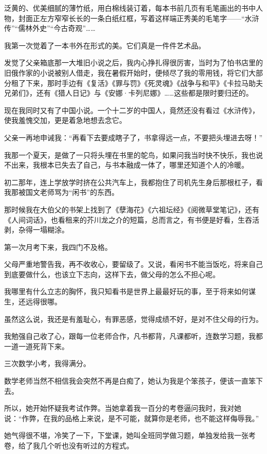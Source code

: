 \par 泛黄的、优美细腻的薄竹纸，用白棉线装订着，每本书前几页有毛笔画出的书中人物，封面正左方窄窄长长的一条白纸红框，写着这样端正秀美的毛笔字——“水浒传”“儒林外史”“今古奇观”……
\par 我第一次觉着了一本书外在形式的美。它们真是一件件艺术品。
\par 发觉了父亲箱底那一大堆旧小说之后，我内心挣扎得很厉害，当时为了怕书店里的旧俄作家的小说被别人借走，我在暑假开始时，便倾尽了我的零用钱，将它们大部分租了下来，那时手边有《复活》《罪与罚》《死灵魂》《战争与和平》《卡拉马助夫兄弟们》，还有《猎人日记》与《安娜·卡列尼娜》……这些都是限时要归还的。
\par 现在我同时又有了中国小说。一个十二岁的中国人，竟然还没有看过《水浒传》，使我羞愧交加，更是着急地想去念它。
\par 父亲一再地申诫我：“再看下去要成瞎子了，书拿得远一点，不要把头埋进去呀！”
\par 我那一个夏天，是做了一只将头埋在书里的鸵鸟，如果问我当时快不快乐，我也说不出来，我根本已失去了自己，与书本融成一体了，哪里还知道个人的冷暖。
\par 初二那年，连上学放学时挤在公共汽车上，我都抱住了司机先生身后那根杠子，看我那被国文老师骂为“闲书”的东西。
\par 那时候我在大伯父的书架上找到了《孽海花》《六祖坛经》《阅微草堂笔记》，还有《人间词话》，也看租来的芥川龙之介的短篇，总而言之，有书便是好看，生吞活剥，杂得一塌糊涂。
\par 第一次月考下来，我四门不及格。
\par 父母严重地警告我，再不收收心，要留级了。又说，看闲书不能当饭吃，将来自己到底要做什么，也该立下志向，这样下去，做父母的怎么不担心呢。
\par 我哪里有什么立志的胸怀，我只知看书是世界上最最好玩的事，至于将来如何谋生，还远得很哪。
\par 虽然这么说，我还是有羞耻心，有罪恶感，觉得成绩不好，是对不住父母的行为。
\par 我勉强自己收了心，跟每一位老师合作，凡书都背，凡课都听，连数学习题，我都一道一道死背下来。
\par 三次数学小考，我得满分。
\par 数学老师当然不相信我会突然不再是白痴了，她认为我是个笨孩子，便该一直笨下去。
\par 所以，她开始怀疑我考试作弊。当她拿着我一百分的考卷逼问我时，我对她说：“作弊，在我的品格上来说，是不可能，就算你是老师，也不能这样侮辱我。”
\par 她气得很不堪，冷笑了一下，下堂课，她叫全班同学做习题，单独发给我一张考卷，给了我几个听也没有听过的方程式。
